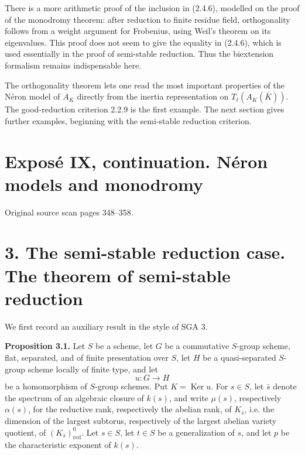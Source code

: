 \documentclass[11pt]{article}
\providecommand{\Ker}{\operatorname{Ker}}
\providecommand{\Hom}{\operatorname{Hom}}
\begin{document}
There is a more arithmetic proof of the inclusion in (2.4.6), modelled on the proof of the monodromy theorem: after reduction to finite residue field, orthogonality follows from a weight argument for Frobenius, using Weil's theorem on its eigenvalues.  This proof does not seem to give the equality in (2.4.6), which is used essentially in the proof of semi-stable reduction.  Thus the biextension formalism remains indispensable here.

The orthogonality theorem lets one read the most important properties of the N\'eron model of \(A_K\) directly from the inertia representation on \(T_\ell(A_K(\bar K))\).  The good-reduction criterion 2.2.9 is the first example.  The next section gives further examples, beginning with the semi-stable reduction criterion.



\providecommand{\rang}{\operatorname{rang}}
\providecommand{\rankmult}{\operatorname{rank}_{\mathrm{mult}}}
\providecommand{\Hom}{\operatorname{Hom}}
\providecommand{\End}{\operatorname{End}}
\providecommand{\Swan}{\operatorname{Swan}}
\providecommand{\cond}{\operatorname{cond}}
\providecommand{\coker}{\operatorname{coker}}
\providecommand{\Lie}{\operatorname{Lie}}
\providecommand{\Tr}{\operatorname{Tr}}

\section*{Exposé IX, continuation. Néron models and monodromy}
\begin{center}
Original source scan pages 348--358.
\end{center}

\section*{3. The semi-stable reduction case. The theorem of semi-stable reduction}

We first record an auxiliary result in the style of SGA 3.

\textbf{Proposition 3.1.} Let \(S\) be a scheme, let \(G\) be a commutative \(S\)-group scheme, flat, separated, and of finite presentation over \(S\), let \(H\) be a quasi-separated \(S\)-group scheme locally of finite type, and let
\[
        u:G\longrightarrow H
\]
be a homomorphism of \(S\)-group schemes.  Put \(K=\Ker u\).  For \(s\in S\), let \(\bar s\) denote the spectrum of an algebraic closure of \(k(s)\), and write \(\mu(s)\), respectively \(\alpha(s)\), for the reductive rank, respectively the abelian rank, of \(K_{\bar s}\), i.e. the dimension of the largest subtorus, respectively of the largest abelian variety quotient, of \((K_{\bar s})^0_{\mathrm{red}}\).  Let \(s\in S\), let \(t\in S\) be a generalization of \(s\), and let \(p\) be the characteristic exponent of \(k(s)\).
\end{document}
